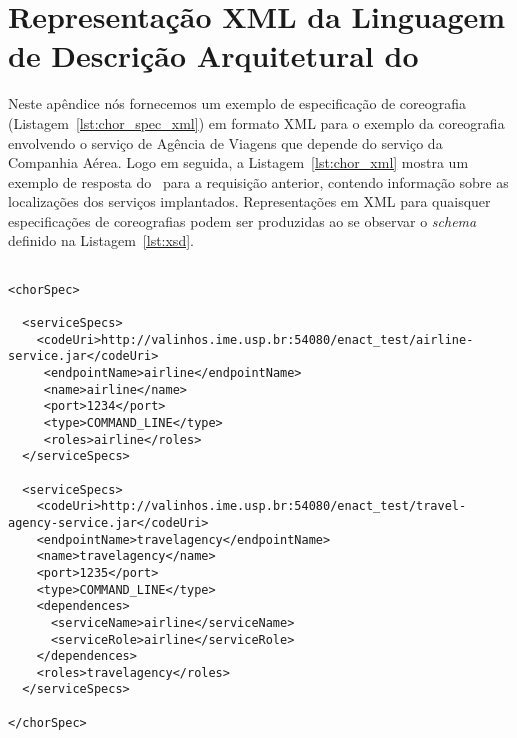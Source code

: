 \chapter{Representação XML da Linguagem de Descrição Arquitetural do \ee}
\label{ape:xml}

Neste apêndice nós fornecemos um exemplo de especificação de coreografia (Listagem~\ref{lst:chor_spec_xml}) em formato XML para o exemplo da coreografia envolvendo o serviço de Agência de Viagens que depende do serviço da Companhia Aérea. Logo em seguida, a Listagem~\ref{lst:chor_xml} mostra um exemplo de resposta do \ee\ para a requisição anterior, contendo informação sobre as localizações dos serviços implantados. Representações em XML para quaisquer especificações de coreografias podem ser produzidas ao se observar o \emph{schema} definido na Listagem~\ref{lst:xsd}.

\lstset{language=XML}

{\footnotesize
\begin{lstlisting}[frame=trbl, label=lst:chor_spec_xml, caption=Exemplo de representação XML da classe \textsf{ChorSpec}]

<chorSpec>

  <serviceSpecs>
    <codeUri>http://valinhos.ime.usp.br:54080/enact_test/airline-service.jar</codeUri>
     <endpointName>airline</endpointName>
     <name>airline</name>
     <port>1234</port>
     <type>COMMAND_LINE</type>
     <roles>airline</roles>
  </serviceSpecs>
  
  <serviceSpecs>
    <codeUri>http://valinhos.ime.usp.br:54080/enact_test/travel-agency-service.jar</codeUri>
    <endpointName>travelagency</endpointName>
    <name>travelagency</name>
    <port>1235</port>
    <type>COMMAND_LINE</type>
    <dependences>
      <serviceName>airline</serviceName>
      <serviceRole>airline</serviceRole>
    </dependences>
    <roles>travelagency</roles>
  </serviceSpecs>
  
</chorSpec>
\end{lstlisting}
}

